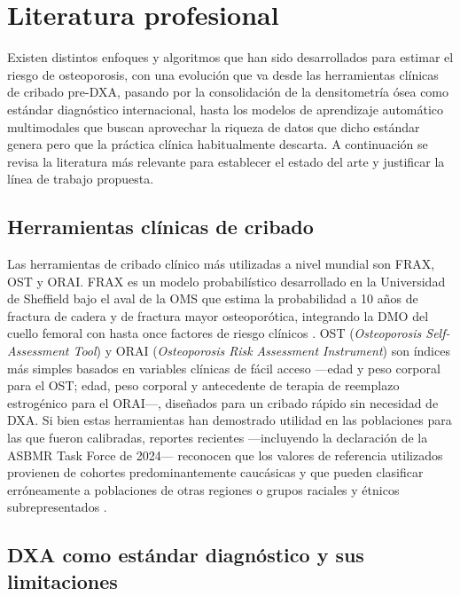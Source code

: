 \documentclass[../tesis.tex]{subfiles}
\begin{document}
\section{Literatura profesional}
\label{literatura}

Existen distintos enfoques y algoritmos que han sido desarrollados para estimar el riesgo de osteoporosis, con una evolución que va desde las herramientas clínicas de cribado pre-DXA, pasando por la consolidación de la densitometría ósea como estándar diagnóstico internacional, hasta los modelos de aprendizaje automático multimodales que buscan aprovechar la riqueza de datos que dicho estándar genera pero que la práctica clínica habitualmente descarta. A continuación se revisa la literatura más relevante para establecer el estado del arte y justificar la línea de trabajo propuesta.

\subsection{Herramientas clínicas de cribado}

Las herramientas de cribado clínico más utilizadas a nivel mundial son FRAX\textregistered{}, OST y ORAI\@. FRAX\textregistered{} es un modelo probabilístico desarrollado en la Universidad de Sheffield bajo el aval de la OMS que estima la probabilidad a 10 años de fractura de cadera y de fractura mayor osteoporótica, integrando la DMO del cuello femoral con hasta once factores de riesgo clínicos \cite{Kanis2008}. OST (\textit{Osteoporosis Self-Assessment Tool}) y ORAI (\textit{Osteoporosis Risk Assessment Instrument}) son índices más simples basados en variables clínicas de fácil acceso ---edad y peso corporal para el OST; edad, peso corporal y antecedente de terapia de reemplazo estrogénico para el ORAI---, diseñados para un cribado rápido sin necesidad de DXA\@. Si bien estas herramientas han demostrado utilidad en las poblaciones para las que fueron calibradas, reportes recientes ---incluyendo la declaración de la ASBMR Task Force de 2024--- reconocen que los valores de referencia utilizados provienen de cohortes predominantemente caucásicas y que pueden clasificar erróneamente a poblaciones de otras regiones o grupos raciales y étnicos subrepresentados \parencite{BurnettBowie2024}.

\subsection{DXA como estándar diagnóstico y sus limitaciones}
\end{document}
